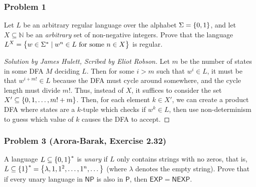 \documentclass{article}
\newenvironment{scribed}[2]{\begin{proof}[Solution by #1, Scribed by #2]}{\end{proof}}
\newcommand{\EXP}{\mathsf{EXP}}
\newcommand{\NP}{\mathsf{NP}}
\newcommand{\Pe}{\mathsf{P}}
\newcommand{\NEXP}{\mathsf{NEXP}}
\newcommand{\Naturals}{\mathbb{N}}
\begin{document}
\subsubsection{Problem 1}
Let \(L\) be an arbitrary regular language over the alphabet \(\Sigma = \set{0,1}\), and let \(X \subseteq \Naturals\) be an \textit{arbitrary} set of non-negative integers. Prove that the language \(L^X = \set{w \in \Sigma^* \mid w^n \in L \text{ for some } n \in X}\) is regular.

\begin{scribed}{James Hulett}{Eliot Robson}
    Let \(m\) be the number of states in some DFA \(M\) deciding \(L\). Then for some \(i > m\) such that \(w^i \in L\), it must be that \(w^{i + m!} \in L\) because the DFA must cycle around somewhere, and the cycle length must divide \(m!\). Thus, instead of \(X\), it suffices to consider the set \(X' \subseteq \set{0, 1, \dots, m! + m}\). Then, for each element \(k \in X'\), we can create a product DFA where states are a \(k\)-tuple which checks if \(w^k \in L\), then use non-determinism to guess which value of \(k\) causes the DFA to accept.
\end{scribed}

\subsubsection{Problem 3 (Arora-Barak, Exercise 2.32)}
A language \(L \subseteq \set{0,1}^*\) is \textit{unary} if \(L\) only contains strings with no zeros, that is, \(L \subseteq \set{1}^* = \set{\lambda, 1, 1^2, \dots, 1^n, \dots}\) (where \(\lambda\) denotes the empty string). Prove that if every unary language in \(\NP\) is also in \(\Pe\), then \(\EXP = \NEXP\).
\end{document}
